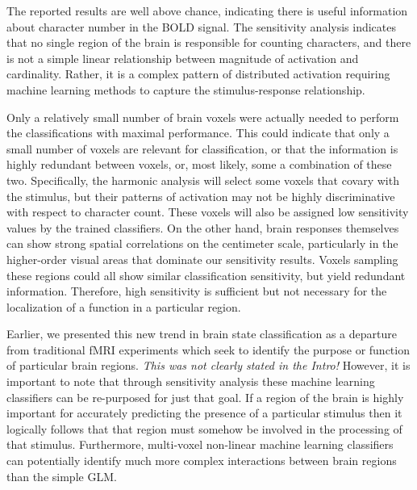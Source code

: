 \documentclass[preprint,5p,authoryear]{elsarticle}
\begin{document}
The reported results are well above chance, indicating there is useful information about character number in the BOLD signal.
The sensitivity analysis indicates that no single region of the brain is responsible for counting characters, and there is not a simple linear relationship between magnitude of activation and cardinality.
Rather, it is a complex pattern of distributed activation requiring machine learning methods to capture the stimulus-response relationship.

Only a relatively small number of brain voxels were actually needed to perform the classifications with maximal performance. This could indicate that only a small number of voxels are relevant for classification, or that the information is highly redundant between voxels, or, most likely, some a combination of these two.
Specifically, the harmonic analysis will select some voxels that covary with the stimulus, but their patterns of activation may not be highly discriminative with respect to character count.
These voxels will also be assigned low sensitivity values by the trained classifiers.
On the other hand, brain responses themselves can show strong spatial correlations on the centimeter scale, particularly in the higher-order visual areas that dominate our sensitivity results. Voxels sampling these regions could all show similar classification sensitivity, but yield redundant information.
Therefore, high sensitivity is sufficient but not necessary for the localization of a function in a particular region.


Earlier, we presented this new trend in brain state classification as a departure from traditional fMRI experiments which seek to identify the purpose or function of particular brain regions. \emph{This was not clearly stated in the Intro!}
However, it is important to note that through sensitivity analysis these machine learning classifiers can be re-purposed for just that goal.
If a region of the brain is highly important for accurately predicting the presence of a particular stimulus then it logically follows that that region must somehow be involved in the processing of that stimulus.
Furthermore, multi-voxel non-linear machine learning classifiers can potentially identify much more complex interactions between brain regions than the simple GLM.


\end{document}
